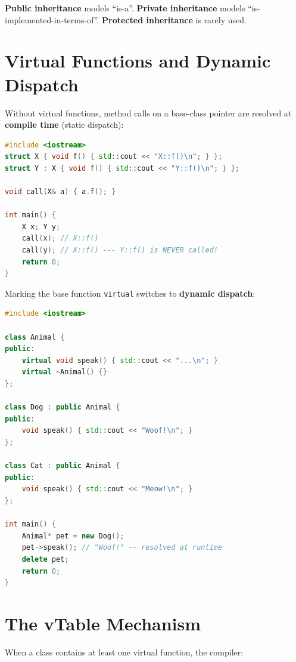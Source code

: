 \textbf{Public inheritance} models ``is-a''. \textbf{Private inheritance} models ``is-implemented-in-terms-of''. \textbf{Protected inheritance} is rarely used.

\section{Virtual Functions and Dynamic Dispatch}
\label{sec:virtual-functions}

Without virtual functions, method calls on a base-class pointer are resolved at \textbf{compile time} (static dispatch):

\begin{lstlisting}[language=C++, caption={Non-virtual --- always calls base version}]
#include <iostream>
struct X { void f() { std::cout << "X::f()\n"; } };
struct Y : X { void f() { std::cout << "Y::f()\n"; } };

void call(X& a) { a.f(); }

int main() {
    X x; Y y;
    call(x); // X::f()
    call(y); // X::f() --- Y::f() is NEVER called!
    return 0;
}
\end{lstlisting}

Marking the base function \texttt{virtual} switches to \textbf{dynamic dispatch}:

\begin{lstlisting}[language=C++, caption={virtual --- correct override called at runtime}]
#include <iostream>

class Animal {
public:
    virtual void speak() { std::cout << "...\n"; }
    virtual ~Animal() {}
};

class Dog : public Animal {
public:
    void speak() { std::cout << "Woof!\n"; }
};

class Cat : public Animal {
public:
    void speak() { std::cout << "Meow!\n"; }
};

int main() {
    Animal* pet = new Dog();
    pet->speak(); // "Woof!" -- resolved at runtime
    delete pet;
    return 0;
}
\end{lstlisting}

\section{The vTable Mechanism}
\label{sec:vtable}

When a class contains at least one virtual function, the compiler:

